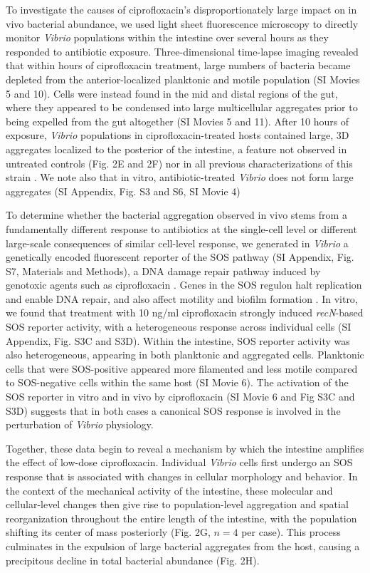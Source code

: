To investigate the causes of ciprofloxacin's disproportionately large impact on in vivo bacterial abundance, we used light sheet fluorescence microscopy to directly monitor \textit{Vibrio} populations within the intestine over several hours as they responded to antibiotic exposure. Three-dimensional time-lapse imaging revealed that within hours of ciprofloxacin treatment, large numbers of bacteria became depleted from the anterior-localized planktonic and motile population (SI Movies 5 and 10). Cells were instead found in the mid and distal regions of the gut, where they appeared to be condensed into large multicellular aggregates prior to being expelled from the gut altogether (SI Movies 5 and 11). After 10 hours of exposure, \textit{Vibrio} populations in ciprofloxacin-treated hosts contained large, 3D aggregates localized to the posterior of the intestine, a feature not observed in untreated controls (Fig. 2E and 2F) nor in all previous characterizations of this strain \cite{Wiles2016,schlomann2018bacterial}. We note also that in vitro, antibiotic-treated \textit{Vibrio} does not form large aggregates (SI Appendix, Fig. S3 and S6, SI Movie 4)

To determine whether the bacterial aggregation observed in vivo stems from a fundamentally different response to antibiotics at the single-cell level or different large-scale consequences of similar cell-level response, we generated in \textit{Vibrio} a genetically encoded fluorescent reporter of the SOS pathway (SI Appendix, Fig. S7, Materials and Methods), a DNA damage repair pathway induced by genotoxic agents such as ciprofloxacin \cite{erill2007aeons,kreuzer2013dna}. Genes in the SOS regulon halt replication and enable DNA repair, and also affect motility and biofilm formation \cite{irazoki2016sos,goneau2015subinhibitory}. In vitro, we found that treatment with 10 ng/ml ciprofloxacin strongly induced \textit{recN}-based SOS reporter activity, with a heterogeneous response across individual cells (SI Appendix, Fig. S3C and S3D). Within the intestine, SOS reporter activity was also heterogeneous, appearing in both planktonic and aggregated cells. Planktonic cells that were SOS-positive appeared more filamented and less motile compared to SOS-negative cells within the same host (SI Movie 6). The activation of the SOS reporter in vitro and in vivo by ciprofloxacin (SI Movie 6 and Fig S3C and S3D) suggests that in both cases a canonical SOS response is involved in the perturbation of \textit{Vibrio} physiology. 

Together, these data begin to reveal a mechanism by which the intestine amplifies the effect of low-dose ciprofloxacin. Individual \textit{Vibrio} cells first undergo an SOS response that is associated with changes in cellular morphology and behavior. In the context of the mechanical activity of the intestine, these molecular and cellular-level changes then give rise to population-level aggregation and spatial reorganization throughout the entire length of the intestine, with the population shifting its center of mass posteriorly (Fig. 2G, $n=4$ per case). This process culminates in the expulsion of large bacterial aggregates from the host, causing a precipitous decline in total bacterial abundance (Fig. 2H).

